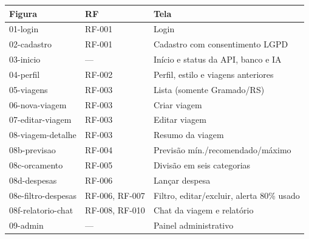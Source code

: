 \begin{tabular}{llp{7.2cm}}
\hline
Figura & RF & Tela \\
\hline
01-login & RF-001 & Login \\
02-cadastro & RF-001 & Cadastro com consentimento LGPD \\
03-inicio & --- & Início e status da API, banco e IA \\
04-perfil & RF-002 & Perfil, estilo e viagens anteriores \\
05-viagens & RF-003 & Lista (somente Gramado/RS) \\
06-nova-viagem & RF-003 & Criar viagem \\
07-editar-viagem & RF-003 & Editar viagem \\
08-viagem-detalhe & RF-003 & Resumo da viagem \\
08b-previsao & RF-004 & Previsão mín./recomendado/máximo \\
08c-orcamento & RF-005 & Divisão em seis categorias \\
08d-despesas & RF-006 & Lançar despesa \\
08e-filtro-despesas & RF-006, RF-007 & Filtro, editar/excluir, alerta 80\% usado \\
08f-relatorio-chat & RF-008, RF-010 & Chat da viagem e relatório \\
09-admin & --- & Painel administrativo \\
\hline
\end{tabular}

